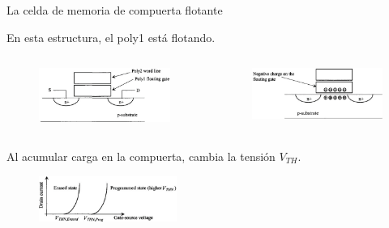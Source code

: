 \documentclass[aspectratio=169,t]{beamer}
\begin{document}
\begin{frame}{La celda de memoria de compuerta flotante}

En esta estructura, el poly1 está flotando.

\begin{columns}

\begin{column}{0.5\textwidth}

\begin{figure}
    \centering
    \includegraphics[width=\textwidth]{figuras/floating_gate_1.png}
\end{figure}

\end{column}

\begin{column}{0.5\textwidth}

\begin{figure}
    \centering
    \includegraphics[width=\textwidth]{figuras/floating_gate_2.png}
\end{figure}

\end{column}

\end{columns}

\vspace{5mm}
Al acumular carga en la compuerta, cambia la tensión $V_{TH}$.

\begin{figure}
    \centering
    \includegraphics[width=0.4\textwidth]{figuras/floating_gate_3.png}
\end{figure}

\end{frame}
\end{document}

